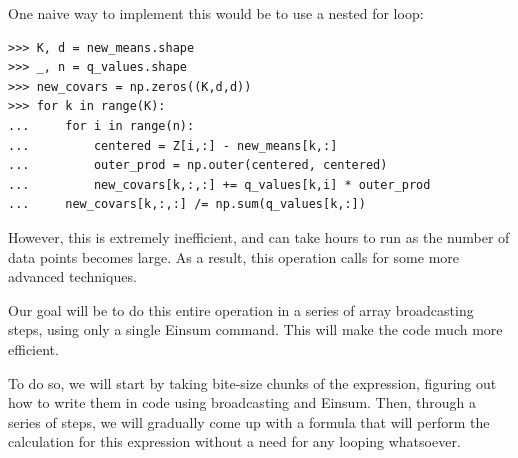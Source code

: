 One naive way to implement this would be to use a nested for loop:
\begin{lstlisting}
>>> K, d = new_means.shape
>>> _, n = q_values.shape
>>> new_covars = np.zeros((K,d,d))
>>> for k in range(K):
... 	for i in range(n):
...	        centered = Z[i,:] - new_means[k,:]
...	        outer_prod = np.outer(centered, centered)
...	        new_covars[k,:,:] += q_values[k,i] * outer_prod
...	    new_covars[k,:,:] /= np.sum(q_values[k,:])
\end{lstlisting}

However, this is extremely inefficient, and can take hours to run as the number of data points becomes large.
As a result, this operation calls for some more advanced techniques.

Our goal will be to do this entire operation in a series of array broadcasting steps, using only a single Einsum command.
This will make the code much more efficient.

To do so, we will start by taking bite-size chunks of the expression, figuring out how to write them in code using broadcasting and Einsum.
Then, through a series of steps, we will gradually come up with a formula that will perform the calculation for this expression without a need for any looping whatsoever.

